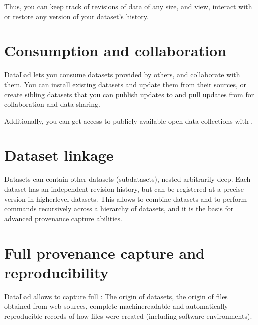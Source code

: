 \begin{figure}[tbp]
\centering

\noindent{}
\end{figure}

\sphinxAtStartPar
Thus, you can keep track of revisions of data of any size, and view, interact with or
restore any version of your dataset’s history.


\section{Consumption and collaboration}
\label{\detokenize{intro/executive_summary:consumption-and-collaboration}}
\sphinxAtStartPar
DataLad lets you consume datasets provided by others, and collaborate with them.
You can install existing datasets and update them from their sources, or create
sibling datasets that you can publish updates to and pull updates from for
collaboration and data sharing.

\begin{figure}[tbp]
\centering

\noindent{}
\end{figure}

\sphinxAtStartPar
Additionally, you can get access to publicly available open
data collections with {\hyperref[\detokenize{glossary:term-the-DataLad-superdataset}]{}}.


\section{Dataset linkage}
\label{\detokenize{intro/executive_summary:dataset-linkage}}
\sphinxAtStartPar
Datasets can contain other datasets (subdatasets), nested arbitrarily deep. Each
dataset has an independent revision history, but can be registered at a precise version
in higher\sphinxhyphen{}level datasets. This allows to combine datasets and to perform commands recursively across
a hierarchy of datasets, and it is the basis for advanced provenance capture abilities.

\begin{figure}[tbp]
\centering

\noindent{}
\end{figure}


\section{Full provenance capture and reproducibility}
\label{\detokenize{intro/executive_summary:full-provenance-capture-and-reproducibility}}
\sphinxAtStartPar
DataLad allows to capture full {\hyperref[\detokenize{glossary:term-provenance}]{}}: The origin of datasets, the
origin of files obtained from web sources, complete machine\sphinxhyphen{}readable and
automatically reproducible records of how files were created (including software
environments).

